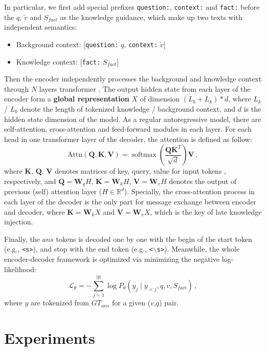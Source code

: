\documentclass[sigconf]{acmart}
\def\mW{{\bm{W}}}
\def\mQ{{\bm{Q}}}
\def\mK{{\bm{K}}}
\def\mV{{\bm{V}}}
\newcommand{\wq}{\mW_q}
\newcommand{\wk}{\mW_k}
\newcommand{\wv}{\mW_v}
\begin{document}
In particular, we first add special prefixes  {\tt question:}, {\tt context:} and {\tt fact:} 
before the $q$, $\tilde{v}$ and $S_{fact}$ as the knowledge guidance, which make up two texts with independent semantics: 
\begin{itemize}
	\item Background context:  [{\tt question:} $q$, {\tt context:} $\tilde{v}$]
	\item Knowledge context: [{\tt fact:} $S_{fact}$]
\end{itemize}
Then the encoder independently processes the background and knowledge context through  $N$ layers transformer \citep{DBLP:conf/nips/VaswaniSPUJGKP17}. 
The output hidden state from each layer of the encoder form a \textbf{global representation} $X$ of dimension $(L_{b}+L_{k})*d$, where $L_{k}$ / $L_{b}$ denote the length of tokenized knowledge / background context, and $d$ is the  hidden state dimension of the model. 
As a regular autoregressive model, there are self-attention, cross-attention and feed-forward modules in each layer. For each head in one transformer layer of the decoder, the attention is defined as follow:
\begin{equation}
	\mathrm{Attn}(\mQ, \mK, \mV) =\operatorname{softmax}\left(\frac{\mQ\mK^{T}}{\sqrt{d}}\right) \mV\,,
\end{equation}
where $\mK$, $\mQ$, $\mV$ denotes matrices of key, query, value for input tokens \citep{DBLP:conf/nips/VaswaniSPUJGKP17}, respectively, and 
$\mQ=\wq H$, $\mK=\wk H$, $\mV=\wv H$ denotes the output of previous (self) attention layer ($H \in \mathbb{R}^{d}$).
Specially, the cross-attention process in each layer of the decoder is the only part for message exchange between encoder and decoder, where $\mK=\wk X$ and $\mV=\wv X$, which is the key of late knowledge injection.

Finally, the $ans$ tokens is decoded one by one with the begin of the start token (e.g., {\tt <s>}), and stop with the  end token (e.g., {\tt <$\backslash$s>}). Meanwhile, the whole encoder-decoder framework is optimized via minimizing the negative log-likelihood:
\begin{equation}
\mathcal{L}_{\theta}=-\sum_{j=1}^{|y|} \log P_{\theta}\left(y_{j} \mid y_{<j}, q, v, S_{fact}\right)\,,
\end{equation}
where $y$  are tokenized from $GT_{ans}$ for a given ($v$,$q$) pair.


\section{Experiments}
\end{document}
